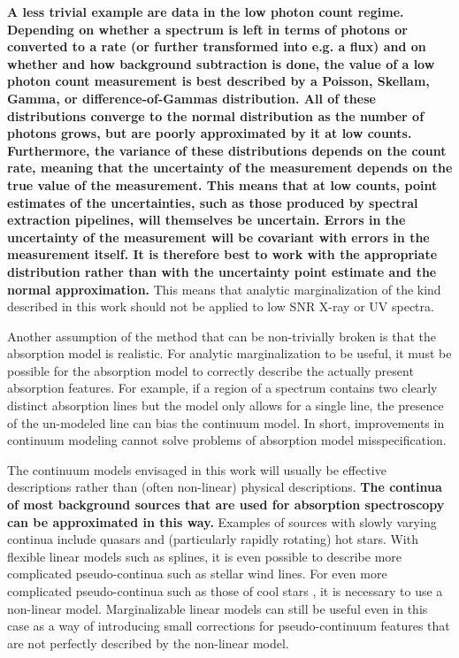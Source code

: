 \documentclass[trackchanges]{aastex62}
\begin{document}
{\bf
A less trivial example are data in the low photon count regime.
Depending on whether a spectrum is left in terms of photons or converted to a rate (or further transformed into e.g. a flux) and on whether and how background subtraction is done, the value of a low photon count measurement is best described by a Poisson, Skellam, Gamma, or difference-of-Gammas distribution.
All of these distributions converge to the normal distribution as the number of photons grows, but are poorly approximated by it at low counts.
Furthermore, the variance of these distributions depends on the count rate, meaning that the uncertainty of the measurement depends on the true value of the measurement.
This means that at low counts, point estimates of the uncertainties, such as those produced by spectral extraction pipelines, will themselves be uncertain.
Errors in the uncertainty of the measurement will be covariant with errors in the measurement itself.
It is therefore best to work with the appropriate distribution rather than with the uncertainty point estimate and the normal approximation.
}
This means that analytic marginalization of the kind described in this work should not be applied to low SNR X-ray or UV spectra.

Another assumption of the method that can be non-trivially broken is that the absorption model is realistic.
For analytic marginalization to be useful, it must be possible for the absorption model to correctly describe the actually present absorption features.
For example, if a region of a spectrum contains two clearly distinct absorption lines but the model only allows for a single line, the presence of the un-modeled line can bias the continuum model.
In short, improvements in continuum modeling cannot solve problems of absorption model misspecification.


The continuum models envisaged in this work will usually be effective descriptions rather than (often non-linear) physical descriptions.
{ \bf The continua of most background sources that are used for absorption spectroscopy can be approximated in this way.}
Examples of sources with slowly varying continua include quasars and (particularly rapidly rotating) hot stars.
With flexible linear models such as splines, it is even possible to describe more complicated pseudo-continua such as stellar wind lines.
For even more complicated pseudo-continua such as those of cool stars \citep[e.g.]{Zasowski:2015hi}, it is necessary to use a non-linear model.
Marginalizable linear models can still be useful even in this case as a way of introducing small corrections for pseudo-continuum features that are not perfectly described by the non-linear model.
\end{document}
